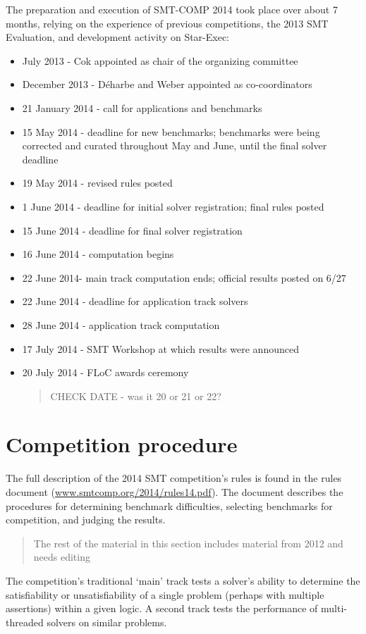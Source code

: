 \documentclass[twosize,11pt]{article}
\newcommand{\comment}[2]{\begin{quote}\sc #1\marginpar{\textcolor{red}{$\ast^{\mbox{#2}}$}}\end{quote}}
\newcommand{\davidc}[1]{\comment{#1}{DC}}
\begin{document}
The preparation and execution of SMT-COMP 2014 took place over about 7 months, relying on the experience of previous competitions, the 2013 SMT Evaluation, and development activity on Star-Exec:
\begin{itemize}
\item July 2013 - Cok appointed as chair of the organizing committee
\item December 2013 - D\'{e}harbe and Weber appointed as co-coordinators
\item 21 January 2014 - call for applications and benchmarks
\item 15 May 2014 - deadline for new benchmarks; benchmarks were being corrected and curated throughout May and June, until the final solver deadline
\item 19 May 2014 - revised rules posted
\item 1 June 2014 - deadline for initial solver registration; final rules posted
\item 15 June 2014 - deadline for final solver registration
\item 16 June 2014 - computation begins
\item 22 June 2014- main track computation ends; official results posted on 6/27 
\item 22 June 2014 - deadline for application track solvers
\item 28 June 2014 - application track computation
\item 17 July 2014 - SMT Workshop at which results were announced
\item 20 July 2014 - FLoC awards ceremony \davidc{CHECK DATE - was it 20 or 21 or 22?}
\end{itemize}

\section{Competition procedure} 
\label{sec:procedure}


The full description of the 2014 SMT competition's rules is found in the rules document (\url{www.smtcomp.org/2014/rules14.pdf}). The document describes the procedures for determining benchmark difficulties, selecting benchmarks for competition, and judging the results.

\davidc{The rest of the material in this section includes material from 2012 and needs editing}

The competition's traditional `main' track tests a solver's ability to determine the satisfiability or unsatisfiability of a single problem (perhaps with multiple assertions) within a given logic. A second track tests the performance of multi-threaded solvers on similar problems.
\end{document}
